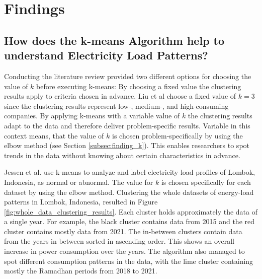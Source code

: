 \section{Findings}
\label{cha:findings}


\subsection{How does the k-means Algorithm help to understand Electricity Load Patterns?}
\label{sec:findings_understand_electricity_load_patterns}
Conducting the literature review provided two different options for choosing the value of $k$ before executing k-means:
By choosing a fixed value the clustering results apply to criteria chosen in advance.
Liu et al \cite{LIU-BDE} choose a fixed value of $k=3$ since the clustering results represent low-, medium-, and high-consuming companies.
By applying k-means with a variable value of $k$ the clustering results adapt to the data and therefore deliver problem-specific results.
Variable in this context means, that the value of $k$ is chosen problem-specifically by using the elbow method (see Section \ref{subsec:finding_k}).
This enables researchers to spot trends in the data without knowing about certain characteristics in advance.

Jessen et al. \cite{JES-IND} use k-means to analyze and label electricity load profiles of Lombok, Indonesia, as normal or abnormal.
The value for $k$ is chosen specifically for each dataset by using the elbow method.
Clustering the whole datasets of energy-load patterns in Lombok, Indonesia, resulted in Figure \ref{fig:whole_data_clustering_results}.
Each cluster holds approximately the data of a single year.
For example, the black cluster contains data from 2015 and the red cluster contains mostly data from 2021.
The in-between clusters contain data from the years in between sorted in ascending order.
This shows an overall increase in power consumption over the years.
The algorithm also managed to spot different consumption patterns in the data, with the lime cluster containing mostly the Ramadhan periods from 2018 to 2021.

